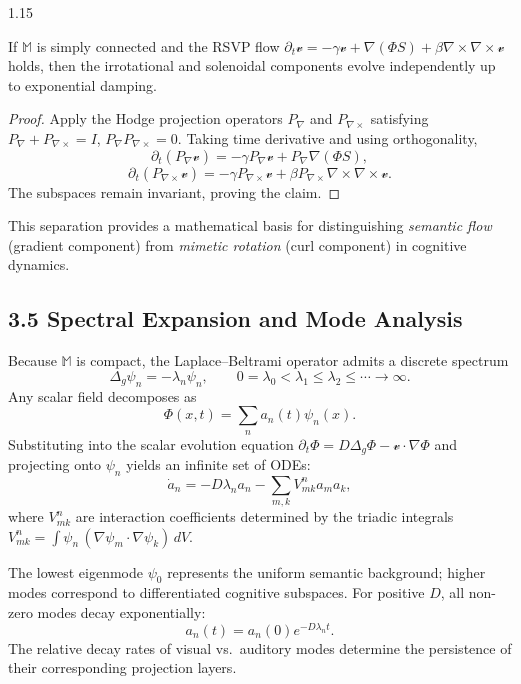 \documentclass[12pt,a4paper]{article}
\begin{document}
\begin{spacing}{1.15}
\begin{theorem}
If $\mathbb{M}$ is simply connected and the RSVP flow
$\partial_t \boldsymbol{\mathcal v}
 = -\gamma\boldsymbol{\mathcal v}
 + \nabla(\Phi S)
 + \beta\nabla\times\nabla\times\boldsymbol{\mathcal v}$
holds, then the irrotational and solenoidal components evolve independently up to exponential damping.
\end{theorem}

\begin{proof}
Apply the Hodge projection operators $P_\nabla$ and $P_{\nabla\times}$ satisfying
$P_\nabla + P_{\nabla\times} = I$,
$P_\nabla P_{\nabla\times}=0$.
Taking time derivative and using orthogonality,
\[
\partial_t (P_\nabla\boldsymbol{\mathcal v})
 = -\gamma P_\nabla\boldsymbol{\mathcal v}
   + P_\nabla\nabla(\Phi S),
\]
\[
\partial_t (P_{\nabla\times}\boldsymbol{\mathcal v})
 = -\gamma P_{\nabla\times}\boldsymbol{\mathcal v}
   + \beta P_{\nabla\times}\nabla\times\nabla\times\boldsymbol{\mathcal v}.
\]
The subspaces remain invariant, proving the claim.
\end{proof}

This separation provides a mathematical basis for distinguishing
\emph{semantic flow} (gradient component) from
\emph{mimetic rotation} (curl component) in cognitive dynamics.

\subsection{3.5 Spectral Expansion and Mode Analysis}

Because $\mathbb{M}$ is compact, the Laplace–Beltrami operator admits a discrete spectrum
\[
\Delta_g \psi_n = -\lambda_n \psi_n,
\qquad 0=\lambda_0 < \lambda_1 \le \lambda_2 \le \cdots \to \infty.
\]
Any scalar field decomposes as
\[
\Phi(x,t) = \sum_{n} a_n(t)\psi_n(x).
\]
Substituting into the scalar evolution equation
$\partial_t\Phi = D\Delta_g\Phi - \boldsymbol{\mathcal v}\cdot\nabla\Phi$
and projecting onto $\psi_n$ yields an infinite set of ODEs:
\[
\dot a_n = -D\lambda_n a_n
 - \sum_{m,k} V_{mk}^n a_m a_k,
\]
where $V_{mk}^n$ are interaction coefficients determined by the triadic integrals
$V_{mk}^n = \int \psi_n\,(\nabla\psi_m\cdot\nabla\psi_k)\,dV$.

The lowest eigenmode $\psi_0$ represents the uniform semantic background;
higher modes correspond to differentiated cognitive subspaces.
For positive $D$, all non-zero modes decay exponentially:
\[
a_n(t) = a_n(0)e^{-D\lambda_n t}.
\]
The relative decay rates of visual vs.\ auditory modes determine the persistence of their corresponding projection layers.


\end{spacing}
\end{document}
